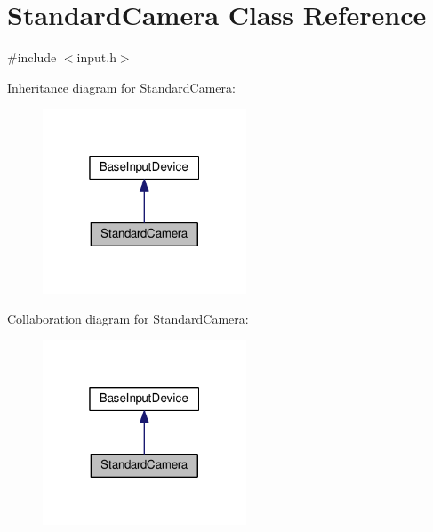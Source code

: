 \hypertarget{classStandardCamera}{}\section{Standard\+Camera Class Reference}
\label{classStandardCamera}


{\ttfamily \#include $<$input.\+h$>$}



Inheritance diagram for Standard\+Camera\+:
\nopagebreak
\begin{figure}[H]
\begin{center}
\leavevmode
\includegraphics[width=172pt]{classStandardCamera__inherit__graph}
\end{center}
\end{figure}


Collaboration diagram for Standard\+Camera\+:
\nopagebreak
\begin{figure}[H]
\begin{center}
\leavevmode
\includegraphics[width=172pt]{classStandardCamera__coll__graph}
\end{center}
\end{figure}
